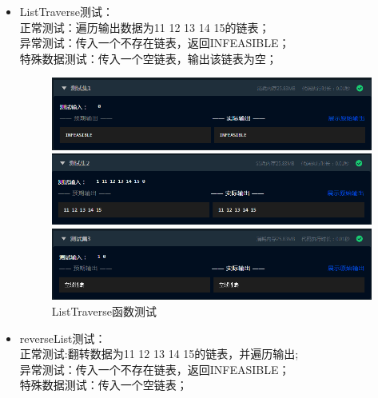 \documentclass[supercite]{Experimental_Report}
\theoremstyle{definition}
\begin{document}
\begin{itemize}
	\item ListTraverse测试：\\正常测试：遍历输出数据为11 12 13 14 15的链表；\\异常测试：传入一个不存在链表，返回INFEASIBLE；\\特殊数据测试：传入一个空链表，输出该链表为空；
	      \begin{figure}[htbp]
		      \centering
		      \begin{minipage}{0.9\linewidth}
			      \centering
			      \includegraphics[width=0.9\linewidth]{images/test-38.png}
		      \end{minipage}
		      \begin{minipage}{0.9\linewidth}
			      \centering
			      \includegraphics[width=0.9\linewidth]{images/test-39.png}
		      \end{minipage}
		      \begin{minipage}{0.9\linewidth}
			      \centering
			      \includegraphics[width=0.9\linewidth]{images/test-40.png}
		      \end{minipage}
		      \caption{ListTraverse函数测试}
		      \label{fig1-15}
	      \end{figure}
	\item reverseList测试：\\正常测试:翻转数据为11 12 13 14 15的链表，并遍历输出;\\异常测试：传入一个不存在链表，返回INFEASIBLE；\\特殊数据测试：传入一个空链表；
	      \newpage
	      \begin{figure}[htbp]
		      \centering
		      \begin{minipage}{0.9\linewidth}

\end{minipage}
\end{figure}
\end{itemize}
\end{document}
